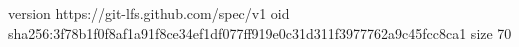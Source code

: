 version https://git-lfs.github.com/spec/v1
oid sha256:3f78b1f0f8af1a91f8ce34ef1df077ff919e0c31d311f3977762a9c45fcc8ca1
size 70
